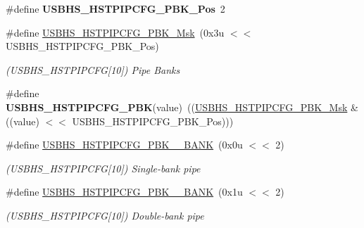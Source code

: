\begin{DoxyCompactItemize}
\#define {\bfseries U\+S\+B\+H\+S\+\_\+\+H\+S\+T\+P\+I\+P\+C\+F\+G\+\_\+\+P\+B\+K\+\_\+\+Pos}~2
\item 
\mbox{\label{group__SAME70__USBHS_ga9103cf0af08386de3cd07a457839e812}} 
\#define \mbox{\hyperlink{group__SAME70__USBHS_ga9103cf0af08386de3cd07a457839e812}{U\+S\+B\+H\+S\+\_\+\+H\+S\+T\+P\+I\+P\+C\+F\+G\+\_\+\+P\+B\+K\+\_\+\+Msk}}~(0x3u $<$$<$ U\+S\+B\+H\+S\+\_\+\+H\+S\+T\+P\+I\+P\+C\+F\+G\+\_\+\+P\+B\+K\+\_\+\+Pos)
\begin{DoxyCompactList}\small\item\em (U\+S\+B\+H\+S\+\_\+\+H\+S\+T\+P\+I\+P\+C\+FG\mbox{[}10\mbox{]}) Pipe Banks \end{DoxyCompactList}\item 
\mbox{\label{group__SAME70__USBHS_ga31f4600714971180d93ba18a7830f5a7}} 
\#define {\bfseries U\+S\+B\+H\+S\+\_\+\+H\+S\+T\+P\+I\+P\+C\+F\+G\+\_\+\+P\+BK}(value)~((\mbox{\hyperlink{group__SAMV71__USBHS_ga9103cf0af08386de3cd07a457839e812}{U\+S\+B\+H\+S\+\_\+\+H\+S\+T\+P\+I\+P\+C\+F\+G\+\_\+\+P\+B\+K\+\_\+\+Msk}} \& ((value) $<$$<$ U\+S\+B\+H\+S\+\_\+\+H\+S\+T\+P\+I\+P\+C\+F\+G\+\_\+\+P\+B\+K\+\_\+\+Pos)))
\item 
\mbox{\label{group__SAME70__USBHS_gac865ef54672a64bc27455bb233edbd67}} 
\#define \mbox{\hyperlink{group__SAME70__USBHS_gac865ef54672a64bc27455bb233edbd67}{U\+S\+B\+H\+S\+\_\+\+H\+S\+T\+P\+I\+P\+C\+F\+G\+\_\+\+P\+B\+K\+\_\+\_\+\+B\+A\+NK}}~(0x0u $<$$<$ 2)
\begin{DoxyCompactList}\small\item\em (U\+S\+B\+H\+S\+\_\+\+H\+S\+T\+P\+I\+P\+C\+FG\mbox{[}10\mbox{]}) Single-\/bank pipe \end{DoxyCompactList}\item 
\mbox{\label{group__SAME70__USBHS_ga5ea6cc1697500d492897379045f858c3}} 
\#define \mbox{\hyperlink{group__SAME70__USBHS_ga5ea6cc1697500d492897379045f858c3}{U\+S\+B\+H\+S\+\_\+\+H\+S\+T\+P\+I\+P\+C\+F\+G\+\_\+\+P\+B\+K\+\_\+\_\+\+B\+A\+NK}}~(0x1u $<$$<$ 2)
\begin{DoxyCompactList}\small\item\em (U\+S\+B\+H\+S\+\_\+\+H\+S\+T\+P\+I\+P\+C\+FG\mbox{[}10\mbox{]}) Double-\/bank pipe \end{DoxyCompactList}\item 

\end{DoxyCompactItemize}
